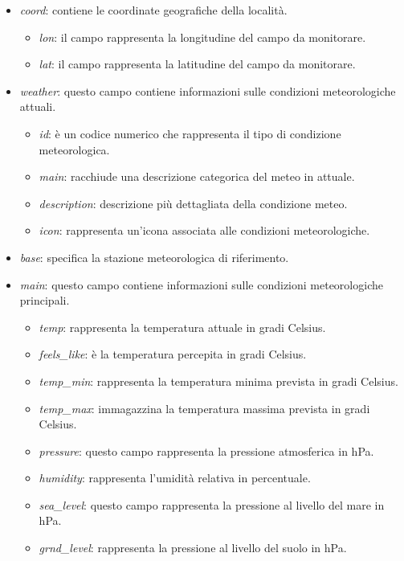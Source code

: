 \begin{itemize}
    \item \textit{coord}: contiene le coordinate geografiche della località.
    \begin{itemize}
        \item \textit{lon}: il campo rappresenta la longitudine del campo da monitorare.
        \item \textit{lat}: il campo rappresenta la latitudine del campo da monitorare.
    \end{itemize}

    \item \textit{weather}: questo campo contiene informazioni sulle condizioni meteorologiche attuali.
    \begin{itemize}
        \item \textit{id}: è un codice numerico che rappresenta il tipo di condizione meteorologica.
        \item \textit{main}: racchiude una descrizione categorica del meteo in attuale.
        \item \textit{description}: descrizione più dettagliata della condizione meteo.
        \item \textit{icon}: rappresenta un'icona associata alle condizioni meteorologiche.
    \end{itemize}
    \item \textit{base}: specifica la stazione meteorologica di riferimento.
    \item \textit{main}: questo campo contiene informazioni sulle condizioni meteorologiche principali.
    \begin{itemize}
        \item \textit{temp}: rappresenta la temperatura attuale in gradi Celsius.
        \item \textit{feels\_like}: è la temperatura percepita in gradi Celsius.
        \item \textit{temp\_min}: rappresenta la temperatura minima prevista in gradi Celsius.
        \item \textit{temp\_max}: immagazzina la temperatura massima prevista in gradi Celsius.
        \item \textit{pressure}: questo campo rappresenta la pressione atmosferica in hPa.
        \item \textit{humidity}: rappresenta l'umidità relativa in percentuale.
        \item \textit{sea\_level}: questo campo rappresenta la pressione al livello del mare in hPa.
        \item \textit{grnd\_level}: rappresenta la pressione al livello del suolo in hPa.
    \end{itemize}
        

\end{itemize}
